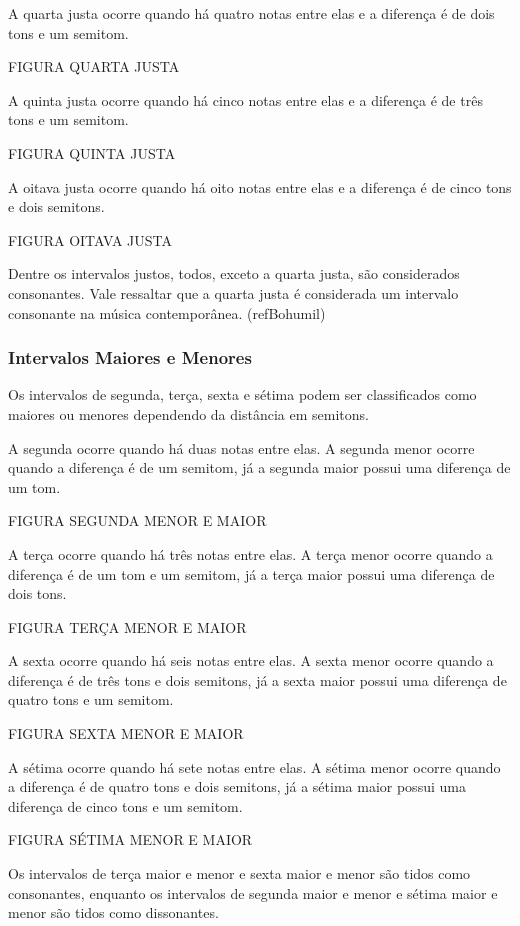         A quarta justa ocorre quando há quatro notas entre elas e a diferença é de dois tons e um semitom.

        FIGURA QUARTA JUSTA

        A quinta justa ocorre quando há cinco notas entre elas e a diferença é de três tons e um semitom.

        FIGURA QUINTA JUSTA

        A oitava justa ocorre quando há oito notas entre elas e a diferença é de cinco tons e dois semitons.

        FIGURA OITAVA JUSTA

        Dentre os intervalos justos, todos, exceto a quarta justa, são considerados consonantes. Vale ressaltar que a quarta justa é considerada um intervalo consonante na música contemporânea. (refBohumil)

      \subsubsection[Intervalos Maiores e Menores]{Intervalos Maiores e Menores}

        Os intervalos de segunda, terça, sexta e sétima podem ser classificados como maiores ou menores dependendo da distância em semitons.

        A segunda ocorre quando há duas notas entre elas. A segunda menor ocorre quando a diferença é de um semitom, já a segunda maior possui uma diferença de um tom.

        FIGURA SEGUNDA MENOR E MAIOR


        A terça ocorre quando há três notas entre elas. A terça menor ocorre quando a diferença é de um tom e um semitom, já a terça maior possui uma diferença de dois tons.

        FIGURA TERÇA MENOR E MAIOR

        A sexta ocorre quando há seis notas entre elas. A sexta menor ocorre quando a diferença é de três tons e dois semitons, já a sexta maior possui uma diferença de quatro tons e um semitom.

        FIGURA SEXTA MENOR E MAIOR

        A sétima ocorre quando há sete notas entre elas. A sétima menor ocorre quando a diferença é de quatro tons e dois semitons, já a sétima maior possui uma diferença de cinco tons e um semitom.

        FIGURA SÉTIMA MENOR E MAIOR

        Os intervalos de terça maior e menor e sexta maior e menor são tidos como consonantes, enquanto os intervalos de segunda maior e menor e sétima maior e menor são tidos como dissonantes.

